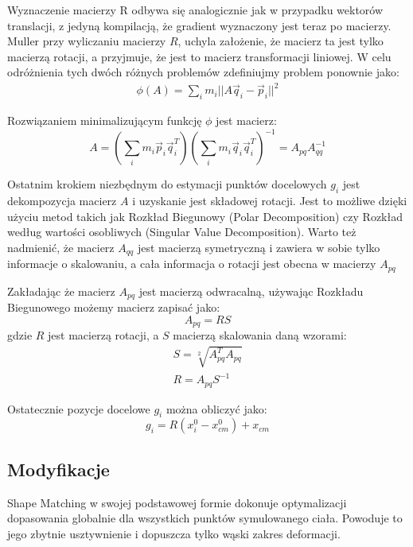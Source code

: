 Wyznaczenie macierzy R odbywa się analogicznie jak w przypadku wektorów
translacji, z jedyną kompilacją, że gradient wyznaczony jest teraz po macierzy.
Muller \cite{shape} przy wyliczaniu macierzy $R$, uchyla założenie, że macierz ta
jest tylko macierzą rotacji, a przyjmuje, że jest to macierz transformacji
liniowej. W celu odróżnienia tych dwóch różnych problemów zdefiniujmy problem
ponownie jako:
\begin{eqnarray}
\phi(A) = \sum_i m_i || A \vec{q}_i - \vec{p}_i||^2
\end{eqnarray}

Rozwiązaniem minimalizującym funkcję $\phi$ jest macierz:\cite{shape}
\begin{equation}
A = (\sum_i m_i \vec{p}_i \vec{q}^T_i)(\sum_i m_i \vec{q}_i \vec{q}^T_i)^{-1}
= A_{pq} A_{qq}^{-1}
\end{equation}

Ostatnim krokiem niezbędnym do estymacji punktów docelowych $g_i$ jest
dekompozycja macierz $A$ i uzyskanie jest składowej rotacji. Jest to możliwe dzięki
użyciu metod takich jak Rozkład Biegunowy (Polar Decomposition) czy Rozkład
według wartości osobliwych (Singular Value Decomposition). Warto też nadmienić,
	że macierz $A_{qq}$ jest macierzą symetryczną i zawiera w sobie tylko
	informacje o skalowaniu, a cała informacja o rotacji jest obecna w
	macierzy $A_{pq}$

Zakładając że macierz $A_{pq}$ jest macierzą odwracalną, używając Rozkładu
Biegunowego możemy macierz zapisać jako:
\begin{equation}
A_{pq} = RS
\end{equation}
gdzie $R$ jest macierzą rotacji, a $S$ macierzą skalowania daną wzorami:
\begin{eqnarray*}
S = \sqrt[2]{A^T_{pq} A_{pq}}\\
R = A_{pq} S^{-1}
\end{eqnarray*}

Ostatecznie pozycje docelowe $g_i$ można obliczyć jako:
\begin{equation}
g_i = R(x_i^0 - x^0_{cm}) + x_{cm}
\end{equation}

\subsection{Modyfikacje}
Shape Matching w swojej podstawowej formie dokonuje optymalizacji dopasowania
globalnie dla wszystkich punktów symulowanego ciała. Powoduje to jego zbytnie
usztywnienie i dopuszcza tylko wąski zakres deformacji.

